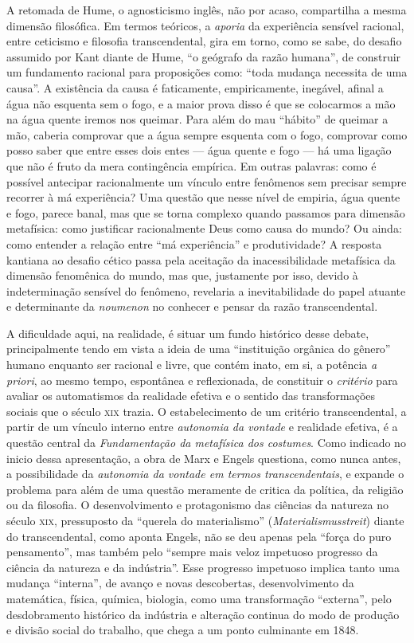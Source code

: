A retomada de Hume, o agnosticismo inglês, não por acaso, compartilha a
mesma dimensão filosófica. Em termos teóricos, a \emph{aporia} da
experiência sensível racional, entre ceticismo e filosofia
transcendental, gira em torno, como se sabe, do desafio assumido por
Kant diante de Hume, ``o geógrafo da razão humana'', de construir um
fundamento racional para proposições como: ``toda mudança necessita de
uma causa''. A existência da causa é faticamente, empiricamente,
inegável, afinal a água não esquenta sem o fogo, e a maior prova disso é
que se colocarmos a mão na água quente iremos nos queimar. Para além do
mau ``hábito'' de queimar a mão, caberia comprovar que a água sempre
esquenta com o fogo, comprovar como posso saber que entre esses dois
entes --- água quente e fogo --- há uma ligação que não é fruto da mera
contingência empírica. Em outras palavras: como é possível antecipar
racionalmente um vínculo entre fenômenos sem precisar sempre recorrer à
má experiência? Uma questão que nesse nível de empiria, água quente e
fogo, parece banal, mas que se torna complexo quando passamos para
dimensão metafísica: como justificar racionalmente Deus como causa do
mundo? Ou ainda: como entender a relação entre ``má experiência'' e
produtividade? A resposta kantiana ao desafio cético passa pela
aceitação da inacessibilidade metafísica da dimensão fenomênica do
mundo, mas que, justamente por isso, devido à indeterminação sensível do
fenômeno, revelaria a inevitabilidade do papel atuante e determinante da
\emph{noumenon} no conhecer e pensar da razão transcendental.

A dificuldade aqui, na realidade, é situar um fundo histórico desse
debate, principalmente tendo em vista a ideia de uma ``instituição
orgânica do gênero'' humano enquanto ser racional e livre, que contém
inato, em si, a potência \emph{a priori}, ao mesmo tempo, espontânea e
reflexionada, de constituir o \emph{critério} para avaliar os
automatismos da realidade efetiva e o sentido das transformações sociais
que o século \textsc{xix} trazia. O estabelecimento de um critério
transcendental, a partir de um vínculo interno entre \emph{autonomia da
vontade} e realidade efetiva, é a questão central da \emph{Fundamentação
da metafísica dos costumes}. Como indicado no inicio dessa apresentação,
a obra de Marx e Engels questiona, como nunca antes, a possibilidade da
\emph{autonomia da vontade em termos transcendentais}, e expande o
problema para além de uma questão meramente de critica da política, da
religião ou da filosofia. O desenvolvimento e protagonismo das ciências
da natureza no século \textsc{xix}, pressuposto da ``querela do
materialismo'' (\emph{Materialismusstreit}) diante do transcendental,
como aponta Engels, não se deu apenas pela ``força do puro pensamento'',
mas também pelo ``sempre mais veloz impetuoso progresso da ciência da
natureza e da indústria''. Esse progresso impetuoso implica tanto uma
mudança ``interna'', de avanço e novas descobertas, desenvolvimento da
matemática, física, química, biologia, como uma transformação
``externa'', pelo desdobramento histórico da indústria e alteração
continua do modo de produção e divisão social do trabalho, que chega a
um ponto culminante em 1848.

